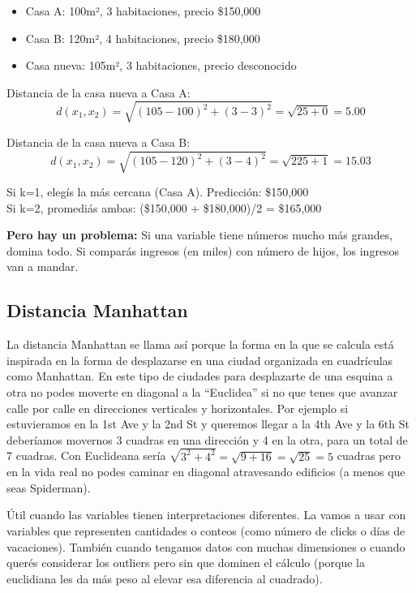 \documentclass[12pt]{article}
\begin{document}
\begin{itemize}
    \item Casa A: 100m², 3 habitaciones, precio \$150,000
    \item Casa B: 120m², 4 habitaciones, precio \$180,000  
    \item Casa nueva: 105m², 3 habitaciones, precio desconocido
\end{itemize}

Distancia de la casa nueva a Casa A:
\[d(x_1, x_2) = \sqrt{(105-100)^2 + (3-3)^2} = \sqrt{25 + 0} = 5.00\]

Distancia de la casa nueva a Casa B:
\[d(x_1, x_2) = \sqrt{(105-120)^2 + (3-4)^2} = \sqrt{225 + 1} = 15.03\]

Si k=1, elegís la más cercana (Casa A). Predicción: \$150,000 \\
Si k=2, promediás ambas: (\$150,000 + \$180,000)/2 = \$165,000

\vspace{0.3em}
\textbf{Pero hay un problema:} Si una variable tiene números mucho más grandes, domina todo. Si comparás ingresos (en miles) con número de hijos, los ingresos van a mandar.

\subsection{Distancia Manhattan}

La distancia Manhattan se llama así porque la forma en la que se calcula está inspirada en la forma de desplazarse en una ciudad organizada en cuadrículas como Manhattan. En este tipo de ciudades para desplazarte de una esquina a otra no podes moverte en diagonal a la ``Euclidea'' si no que tenes que avanzar calle por calle en direcciones verticales y horizontales. Por ejemplo si estuvieramos en la 1st Ave y la 2nd St y queremos llegar a la 4th Ave y la 6th St deberíamos movernos 3 cuadras en una dirección y 4 en la otra, para un total de 7 cuadras. Con Euclideana sería $\sqrt{3^2 + 4^2} = \sqrt{9 + 16} = \sqrt{25} = 5$ cuadras pero en la vida real no podes caminar en diagonal atravesando edificios (a menos que seas Spiderman).

\vspace{0.5em}

Útil cuando las variables tienen interpretaciones diferentes. La vamos a usar con variables que representen cantidades o conteos (como número de clicks o días de vacaciones). También cuando tengamos datos con muchas dimensiones o cuando querés considerar los outliers pero sin que dominen el cálculo (porque la euclidiana les da más peso al elevar esa diferencia al cuadrado).
\end{document}
